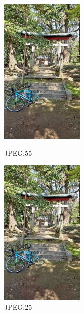 \documentclass[a4paper,11pt]{bxjsarticle}
\begin{document}
   \begin{figure}[htbp]
    \begin{minipage}{0.5\hsize}
     \begin{center}
      \includegraphics[width=40mm]{sample_j55.jpg}
     \end{center}
     \caption{JPEG:55}
     \label{fig:j55}
    \end{minipage}
    \begin{minipage}{0.5\hsize}
     \begin{center}
      \includegraphics[width=40mm]{sample_j25.jpg}
     \end{center}
     \caption{JPEG:25}
     \label{fig:j25}
    \end{minipage}
   \end{figure}
\end{document}
